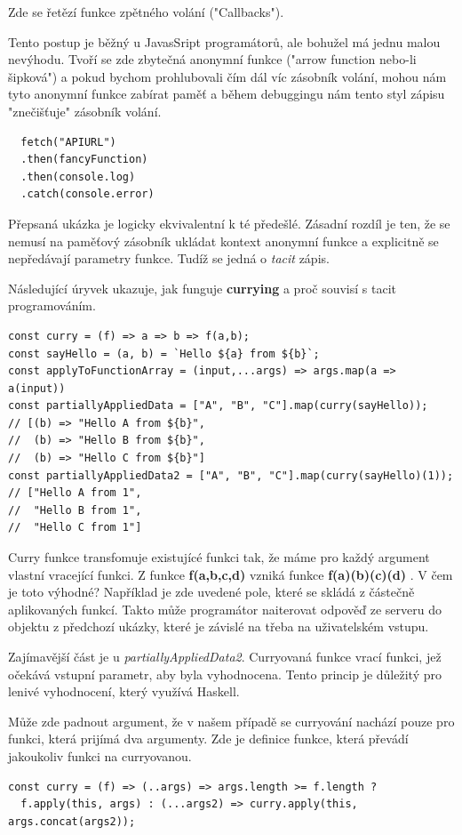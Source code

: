 \documentclass[male,czech]{kithesis}
\begin{document}
Zde se řetězí funkce zpětného volání ("Callbacks").

Tento postup je běžný u JavasSript programátorů, ale bohužel má jednu malou nevýhodu.
Tvoří se zde zbytečná anonymní funkce ("arrow function nebo-li šipková") a pokud bychom prohlubovali čím dál víc 
zásobník volání, mohou nám tyto anonymní funkce zabírat paměť a během debuggingu nám tento styl zápisu "znečišťuje" 
zásobník volání. 

\begin{verbatim}
  fetch("APIURL")
  .then(fancyFunction)
  .then(console.log)
  .catch(console.error)
\end{verbatim}

Přepsaná ukázka je logicky ekvivalentní k té předešlé. Zásadní rozdíl je ten, že se nemusí na paměťový zásobník ukládat kontext anonymní funkce 
a explicitně se nepředávají parametry funkce. Tudíž se jedná o \textit{tacit} zápis.

Následující úryvek ukazuje, jak funguje \textbf{currying} a proč souvisí s tacit programováním.
\begin{verbatim}
const curry = (f) => a => b => f(a,b);
const sayHello = (a, b) = `Hello ${a} from ${b}`;
const applyToFunctionArray = (input,...args) => args.map(a => a(input))
const partiallyAppliedData = ["A", "B", "C"].map(curry(sayHello)); 
// [(b) => "Hello A from ${b}", 
//  (b) => "Hello B from ${b}", 
//  (b) => "Hello C from ${b}"]
const partiallyAppliedData2 = ["A", "B", "C"].map(curry(sayHello)(1)); 
// ["Hello A from 1", 
//  "Hello B from 1", 
//  "Hello C from 1"]
\end{verbatim}
Curry funkce transfomuje existujícé funkci tak, že máme pro každý argument vlastní vracející funkci. Z 
funkce \textbf{f(a,b,c,d)} vzniká funkce \textbf{f(a)(b)(c)(d)} \cite{Currying}. V čem je toto výhodné?
Například je zde uvedené pole, které se skládá z částečně aplikovaných funkcí. 
Takto může programátor naiterovat odpověď ze serveru do objektu z předchozí ukázky, které je závislé na třeba na uživatelském vstupu. 

Zajímavější část je u \textit{partiallyAppliedData2}. Curryovaná funkce vrací 
funkci, jež očekává vstupní parametr, aby byla vyhodnocena. Tento princip je důležitý
pro lenivé vyhodnocení, který využívá Haskell.

Může zde padnout argument, že v našem případě se curryování nachází pouze pro funkci,
která prijímá dva argumenty. Zde je definice funkce, která převádí jakoukoliv funkci na curryovanou.

\begin{verbatim}
const curry = (f) => (..args) => args.length >= f.length ? 
  f.apply(this, args) : (...args2) => curry.apply(this, args.concat(args2));
\end{verbatim}
\end{document}
